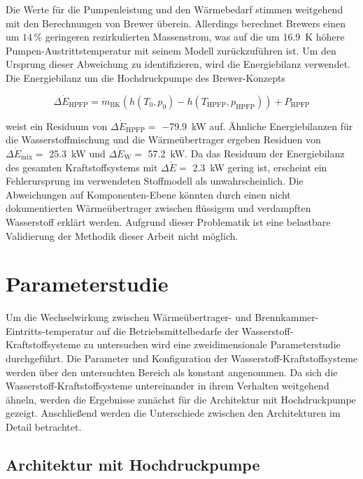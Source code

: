Die Werte für die Pumpenleistung und den Wärmebedarf stimmen weitgehend mit den Berechnungen von Brewer überein. Allerdings berechnet Brewers einen um $14\,\%$ geringeren rezirkulierten Massenstrom, was auf die um \SI{16.9}{\K} höhere Pumpen-Austrittstemperatur mit seinem Modell zurückzuführen ist. Um den Ursprung dieser Abweichung zu identifizieren, wird die Energiebilanz verwendet. Die Energiebilanz um die Hochdruckpumpe des Brewer-Konzepts 

\begin{equation}\label{Eq:brewer}
	\Delta \dot{E}_\mathrm{HPFP}=\dot{m}_\mathrm{BK}(h(T_0,p_0)-h(T_\mathrm{HPFP}, p_\mathrm{HPFP}))+P_\mathrm{HPFP}
\end{equation}

weist ein Residuum von $\Delta \dot{E}_\mathrm{HPFP}=$ \SI{-79.9}{\kilo\W} auf. Ähnliche Energiebilanzen für die Wasserstoffmischung und die Wärmeübertrager ergeben Residuen von $\Delta \dot{E}_\mathrm{mix}=$ \SI{25.3}{\kilo\W} und $\Delta \dot{E}_\mathrm{W}=$ \SI{57.2}{\kilo\W}. Da das Residuum der Energiebilanz des gesamten Kraftstoffsystems mit $\Delta \dot{E}=$ \SI{2.3}{\kilo\W} gering ist, erscheint ein Fehlerursprung im verwendeten Stoffmodell als unwahrscheinlich. Die Abweichungen auf Komponenten-Ebene könnten durch einen nicht dokumentierten Wärmeübertrager zwischen flüssigem und verdampften Wasserstoff erklärt werden. Aufgrund dieser Problematik ist eine belastbare Validierung der Methodik dieser Arbeit nicht möglich.

\section{Parameterstudie}

Um die Wechselwirkung zwischen Wärmeübertrager- und Brennkammer-Eintritts-temperatur auf die Betriebsmittelbedarfe der Wasserstoff-Kraftstoffsysteme zu untersuchen wird eine zweidimensionale Parameterstudie durchgeführt. Die Parameter und Konfiguration der Wasserstoff-Kraftstoffsysteme werden über den untersuchten Bereich als konstant angenommen. Da sich die Wasserstoff-Kraftstoffsysteme untereinander in ihrem Verhalten weitgehend ähneln, werden die Ergebnisse zunächst für die Architektur mit Hochdruckpumpe gezeigt. Anschließend werden die Unterschiede zwischen den Architekturen im Detail betrachtet.

\subsection{Architektur mit Hochdruckpumpe}

